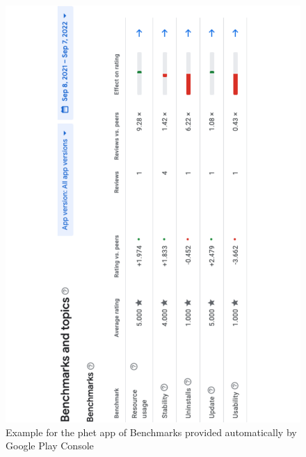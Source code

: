 \begin{figure}
    \centering
    \includegraphics[width=\linewidth]{images/google-play-console/PhET-Review-Benchmarks-Screenshot-2022-09-07.pdf}
    \caption[Example for the \acrshort{phet} app of Benchmarks provided automatically by Google Play Console]{Example for the \Gls{phet} app of Benchmarks provided automatically by Google Play Console}
    \label{fig:PhET-Review-Benchmarks-Screenshot-2022-09-07}
\end{figure}

